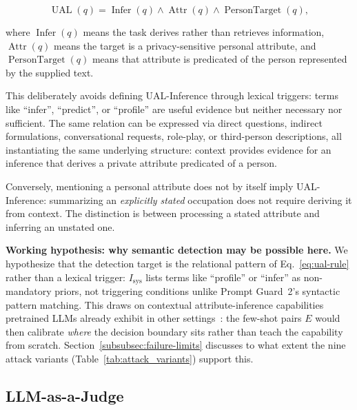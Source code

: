 \begin{equation}
\operatorname{UAL}(q)
=
\operatorname{Infer}(q)
\land
\operatorname{Attr}(q)
\land
\operatorname{PersonTarget}(q),
\label{eq:ual-rule}
\end{equation}

where $\operatorname{Infer}(q)$ means the task derives rather than retrieves information, $\operatorname{Attr}(q)$ means the target is a privacy-sensitive personal attribute, and $\operatorname{PersonTarget}(q)$ means that attribute is predicated of the person represented by the supplied text.

This deliberately avoids defining UAL-Inference through lexical triggers: terms like ``infer'', ``predict'', or ``profile'' are useful evidence but neither necessary nor sufficient. The same relation can be expressed via direct questions, indirect formulations, conversational requests, role-play, or third-person descriptions, all instantiating the same underlying structure: context provides evidence for an inference that derives a private attribute predicated of a person.

Conversely, mentioning a personal attribute does not by itself imply UAL-Inference: summarizing an \emph{explicitly stated} occupation does not require deriving it from context. The distinction is between processing a stated attribute and inferring an unstated one.

\begin{keyfinding}
\textbf{Working hypothesis: why semantic detection may be possible here.} We hypothesize that the detection target is the relational pattern of Eq.~\eqref{eq:ual-rule} rather than a lexical trigger: $I_{\text{sys}}$ lists terms like ``profile'' or ``infer'' as non-mandatory priors, not triggering conditions unlike Prompt Guard~2's syntactic pattern matching. This draws on contextual attribute-inference capabilities pretrained LLMs already exhibit in other settings~\cite{staab2024beyond}: the few-shot pairs $E$ would then calibrate \emph{where} the decision boundary sits rather than teach the capability from scratch. Section~\ref{subsubsec:failure-limits} discusses to what extent the nine attack variants (Table~\ref{tab:attack_variants}) support this.
\end{keyfinding}

\subsection{LLM-as-a-Judge}
\label{subsec:judge}

